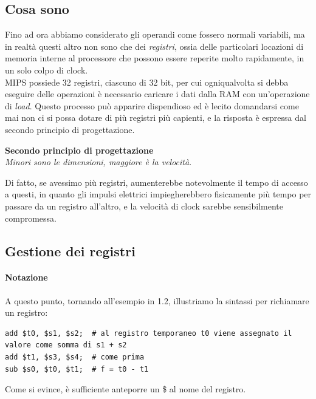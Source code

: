\documentclass[class=book, crop=false]{standalone}
\begin{document}
\subsection{Cosa sono}

Fino ad ora abbiamo considerato gli operandi come fossero normali variabili, ma in realtà questi altro non sono che dei \emph{registri}, ossia delle particolari locazioni di memoria interne al processore che possono essere reperite molto rapidamente, in un solo colpo di clock.\\

MIPS possiede 32 registri, ciascuno di 32 bit, per cui ogniqualvolta si debba eseguire delle operazioni è necessario caricare i dati dalla RAM con un'operazione di \emph{load}. Questo processo può apparire dispendioso ed è lecito domandarsi come mai non ci si possa dotare di più registri più capienti, e la risposta è espressa dal secondo principio di progettazione.

\vspace{8pt}
\begin{tcolorbox}
\centering
\textbf{Secondo principio di progettazione}\\
\emph{Minori sono le dimensioni, maggiore è la velocità}.
\end{tcolorbox}
\vspace{5pt}

Di fatto, se avessimo  più registri, aumenterebbe notevolmente il tempo di accesso a questi, in quanto gli impulsi elettrici impiegherebbero fisicamente più tempo per passare da un registro all'altro, e la velocità di clock sarebbe sensibilmente compromessa.

\subsection{Gestione dei registri}

\paragraph{Notazione}
A questo punto, tornando all'esempio in 1.2, illustriamo la sintassi per richiamare un registro:
\begin{verbatim}
add $t0, $s1, $s2;  # al registro temporaneo t0 viene assegnato il valore come somma di s1 + s2
add $t1, $s3, $s4;  # come prima
sub $s0, $t0, $t1;  # f = t0 - t1
\end{verbatim}
Come si evince, è sufficiente anteporre un \$ al nome del registro.
\end{document}
